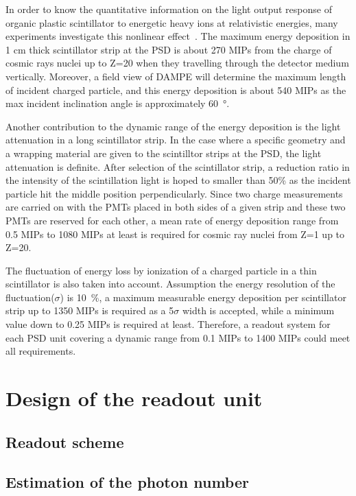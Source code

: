 \documentclass[5p, times]{elsarticle}
\begin{document}
In order to know the quantitative information on the light output response of organic plastic scintillator to energetic heavy ions at relativistic energies, many experiments investigate this nonlinear effect~\cite{dwyer1985plastic,bindi2005performance,marrocchesi2011beam}. 
The maximum energy deposition in 1 cm thick scintillator strip at the PSD is about 270 MIPs from the charge of cosmic rays nuclei up to Z=20 when they travelling through the detector medium vertically. 
Moreover, a field view of DAMPE will determine the maximum length of incident charged particle, and this energy deposition is about 540 MIPs as the max incident inclination angle is approximately \SI{60}{\degree}.

Another contribution to the dynamic range of the energy deposition is the light attenuation in a long scintillator strip. 
In the case where a specific geometry and a wrapping material are given to the scintilltor strips at the PSD, the light attenuation is definite. 
After selection of the scintillator strip, a reduction ratio in the intensity of the scintillation light is hoped to smaller than 50\% as the incident particle hit the middle position perpendicularly.
Since two charge measurements are carried on with the PMTs placed in both sides of a given strip and these two PMTs are reserved for each other, a mean rate of energy deposition range from 0.5 MIPs to 1080 MIPs at least is required for cosmic ray nuclei from Z=1 up to Z=20.

The fluctuation of energy loss by ionization of a charged particle in a thin scintillator is also taken into account.
Assumption the energy resolution of the fluctuation($\sigma$) is \SI{10}{\percent}, a maximum measurable energy deposition per scintillator strip up to 1350 MIPs is required as a 5$\sigma $ width is accepted, while a minimum value down to 0.25 MIPs is required at least. 
Therefore, a readout system for each PSD unit covering a dynamic range from 0.1 MIPs to 1400 MIPs could meet all requirements.

\section{Design of the readout unit}
\label{sec:design}

\subsection{Readout scheme}

\subsection{Estimation of the photon number}
\end{document}
